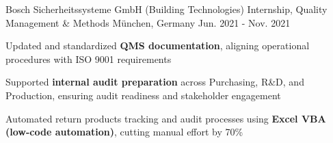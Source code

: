 \begin{cventries}
  \cventry
    {Bosch Sicherheitssysteme GmbH (Building Technologies)} %
    {Internship, Quality Management \& Methods} %
    {München, Germany} %
    {Jun. 2021 - Nov. 2021} %
    {
      \begin{cvitems} %
        \item {Updated and standardized \textbf{QMS documentation}, aligning operational procedures with ISO 9001 requirements}
        \item{Supported \textbf{internal audit preparation} across Purchasing, R\&D, and Production, ensuring audit readiness and stakeholder engagement}
        \item {Automated return products tracking and audit processes using \textbf{Excel VBA (low-code automation)}, cutting manual effort by 70\%}
      \end{cvitems}
    }
    

\end{cventries}
